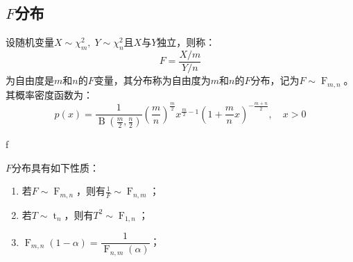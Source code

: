 \subsection{$F$分布}
\begin{definition}
	设随机变量$X\sim \chi_m^2,\;Y\sim\chi_n^2$且$X$与$Y$独立，则称：
	\begin{equation*}
		F=\frac{X/m}{Y/n}
	\end{equation*}
	为自由度是$m$和$n$的$F$变量，其分布称为自由度为$m$和$n$的$F$分布，记为$F\sim \operatorname{F}_{m,n}$。
	其概率密度函数为：
	\begin{equation*}
		p(x)=\frac{1}{\operatorname{B}\left(\frac{m}{2},\frac{n}{2}\right)}
		\left(\frac{m}{n}\right)^{\frac{m}{2}}x^{\frac{m}{2}-1}
		\left(1+\frac{m}{n}x\right)^{-\frac{m+n}{2}},\quad x>0
	\end{equation*}
\end{definition}
\begin{densityplot}{f}
	\caption{$F$ 分布 $\operatorname{F}_{5,10}$ 的概率密度函数}
\end{densityplot}
\begin{property}\label{prop:FDistribution}
	$F$分布具有如下性质：
	\begin{enumerate}
		\item 若$F\sim \operatorname{F}_{m,n}$，则有$\frac{1}{F}\sim \operatorname{F}_{n,m}$；
		\item 若$T\sim \operatorname{t}_n$，则有$T^2\sim \operatorname{F}_{1,n}$；
		\item $\operatorname{F}_{m,n}(1-\alpha)=\dfrac{1}{\operatorname{F}_{n,m}(\alpha)}$；
	\end{enumerate}
\end{property}

